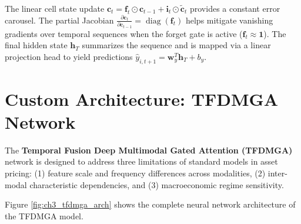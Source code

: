 The linear cell state update $\mathbf{c}_t = \mathbf{f}_t \odot \mathbf{c}_{t-1} + \mathbf{i}_t \odot \tilde{\mathbf{c}}_t$ provides a constant error carousel. The partial Jacobian $\frac{\partial \mathbf{c}_t}{\partial \mathbf{c}_{t-1}} = \operatorname{diag}(\mathbf{f}_t)$ helps mitigate vanishing gradients over temporal sequences when the forget gate is active ($\mathbf{f}_t \approx \mathbf{1}$). The final hidden state $\mathbf{h}_T$ summarizes the sequence and is mapped via a linear projection head to yield predictions $\hat{y}_{i, t+1} = \mathbf{w}_y^T \mathbf{h}_T + b_y$.

\section{Custom Architecture: TFDMGA Network}
\label{sec:ch3_tfdmga_arch}

The \textbf{Temporal Fusion Deep Multimodal Gated Attention (TFDMGA)} network is designed to address three limitations of standard models in asset pricing: (1) feature scale and frequency differences across modalities, (2) inter-modal characteristic dependencies, and (3) macroeconomic regime sensitivity.

Figure \ref{fig:ch3_tfdmga_arch} shows the complete neural network architecture of the TFDMGA model.

